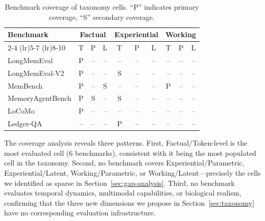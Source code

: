 \begin{table}[t]
	\centering
	\caption{Benchmark coverage of taxonomy cells. ``P'' indicates primary coverage, ``S'' secondary coverage.}
	\label{tab:benchmark_coverage}
	\small
	\begin{tabular}{lccccccccc}
		\toprule
		\multirow{2}{*}{\textbf{Benchmark}} & \multicolumn{3}{c}{\textbf{Factual}} & \multicolumn{3}{c}{\textbf{Experiential}} & \multicolumn{3}{c}{\textbf{Working}}                               \\
		\cmidrule(lr){2-4} \cmidrule(lr){5-7} \cmidrule(lr){8-10}
		                                    & T                                    & P                                         & L                                    & T  & P  & L  & T  & P  & L  \\
		\midrule
		LongMemEval                         & P                                    & --                                        & --                                   & -- & -- & -- & -- & -- & -- \\
		LongMemEval-V2                      & P                                    & --                                        & --                                   & S  & -- & -- & -- & -- & -- \\
		MemBench                            & P                                    & --                                        & S                                    & -- & -- & -- & P  & -- & -- \\
		MemoryAgentBench                    & P                                    & S                                         & --                                   & S  & -- & -- & -- & -- & -- \\
		LoCoMo                              & P                                    & --                                        & --                                   & -- & -- & -- & -- & -- & -- \\
		Ledger-QA                           & --                                   & --                                        & --                                   & P  & -- & -- & -- & -- & -- \\
		\bottomrule
	\end{tabular}
\end{table}

The coverage analysis reveals three patterns. First, Factual/Token-level is the most evaluated cell (6 benchmarks), consistent with it being the most populated cell in the taxonomy. Second, no benchmark covers Experiential/Parametric, Experiential/Latent, Working/Parametric, or Working/Latent---precisely the cells we identified as sparse in Section~\ref{sec:gap-analysis}. Third, no benchmark evaluates temporal dynamics, multimodal capabilities, or biological realism, confirming that the three new dimensions we propose in Section~\ref{sec:taxonomy} have no corresponding evaluation infrastructure.

